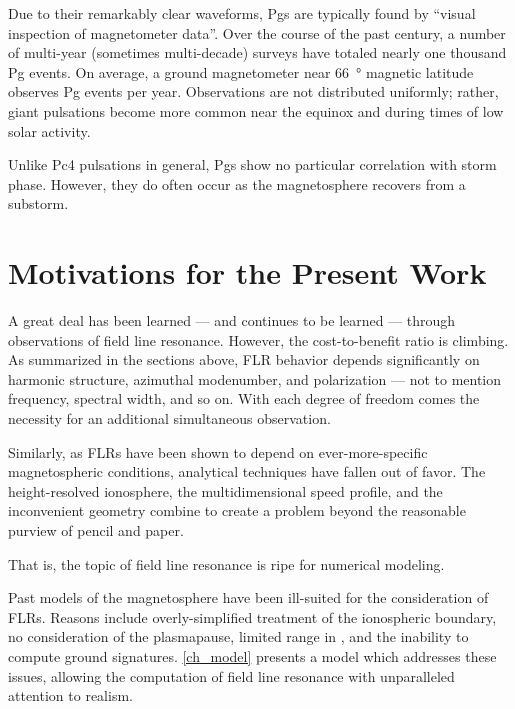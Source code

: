 
Due to their remarkably clear waveforms, Pgs are typically found by ``visual inspection of magnetometer data''\cite{motoba_2015}. Over the course of the past century, a number of multi-year (sometimes multi-decade\cite{brekke_1987}) surveys have totaled nearly one thousand Pg events. On average, a ground magnetometer near \SI{66}{\degree} magnetic latitude observes  Pg events per year\cite{brekke_1987,harang_1941,rolf_1931,sucksdorff_1939}. Observations are not distributed uniformly; rather, giant pulsations become more common near the equinox and during times of low solar activity. 

Unlike Pc4 pulsations in general, Pgs show no particular correlation with storm phase\cite{motoba_2015}. However, they do often occur as the magnetosphere recovers from a substorm\cite{motoba_2015,rostoker_1979}. 

\section{Motivations for the Present Work}

A great deal has been learned --- and continues to be learned --- through observations of field line resonance. However, the cost-to-benefit ratio is climbing. As summarized in the sections above, FLR behavior depends significantly on harmonic structure, azimuthal modenumber, and polarization --- not to mention frequency, spectral width, and so on. With each degree of freedom comes the necessity for an additional simultaneous observation. 

Similarly, as FLRs have been shown to depend on ever-more-specific magnetospheric conditions, analytical techniques have fallen out of favor. The height-resolved ionosphere, the multidimensional \Alfven speed profile, and the inconvenient geometry combine to create a problem beyond the reasonable purview of pencil and paper. 

That is, the topic of field line resonance is ripe for numerical modeling. 

Past models of the magnetosphere have been ill-suited for the consideration of FLRs. Reasons include overly-simplified treatment of the ionospheric boundary, no consideration of the plasmapause, limited range in \azm, and the inability to compute ground signatures. \cref{ch_model} presents a model which addresses these issues, allowing the computation of field line resonance with unparalleled attention to realism. 

